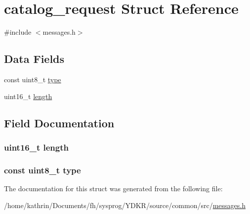 \hypertarget{structcatalog__request}{
\section{catalog\_\-request Struct Reference}
\label{structcatalog__request}
}


{\ttfamily \#include $<$messages.h$>$}

\subsection*{Data Fields}
\begin{DoxyCompactItemize}
\item 
const uint8\_\-t \hyperlink{structcatalog__request_aca7dafb0092715a03dd40f45fc607f2a}{type}
\item 
uint16\_\-t \hyperlink{structcatalog__request_a1892eba2086d12ac2b09005aeb09ea3b}{length}
\end{DoxyCompactItemize}


\subsection{Field Documentation}
\hypertarget{structcatalog__request_a1892eba2086d12ac2b09005aeb09ea3b}{
\subsubsection[{length}]{\setlength{\rightskip}{0pt plus 5cm}uint16\_\-t {\bf length}}}
\label{structcatalog__request_a1892eba2086d12ac2b09005aeb09ea3b}
\hypertarget{structcatalog__request_aca7dafb0092715a03dd40f45fc607f2a}{
\subsubsection[{type}]{\setlength{\rightskip}{0pt plus 5cm}const uint8\_\-t {\bf type}}}
\label{structcatalog__request_aca7dafb0092715a03dd40f45fc607f2a}


The documentation for this struct was generated from the following file:\begin{DoxyCompactItemize}
\item 
/home/kathrin/Documents/fh/sysprog/YDKR/source/common/src/\hyperlink{messages_8h}{messages.h}\end{DoxyCompactItemize}
